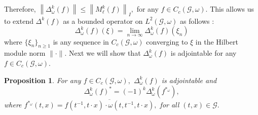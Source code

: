 \documentclass[a4paper,11pt,reqno]{amsart}
\theoremstyle{plain}
\newtheorem{prop}[thm]{Proposition}
\theoremstyle{mainthmstyle}
\theoremstyle{named}
\numberwithin{equation}{section}
\begin{document}
Therefore, $\left \|\Delta_{\omega}^k (f) \right \| \leq \left \|M_{\ell}^k (f) \right \|_{I},$ for any $f \in C_c (\mathcal G, \omega).$ This allows us to extend $\Delta^k (f)$ as a bounded operator on $L^2 (\mathcal G, \omega)$ as follows $:$ 
$$\Delta_{\omega}^k (f) (\xi) = \lim\limits_{n \to \infty} \Delta_{\omega}^k (f) (\xi_n)$$
where $\{\xi_n \}_{n \geq 1}$ is any sequence in $C_c (\mathcal G, \omega)$ converging to $\xi$ in the Hilbert module norm $\|\cdot\|.$ Next we will show that $\Delta_{\omega}^k (f)$ is adjointable for any $f \in C_c (\mathcal G, \omega).$

\begin{prop}\label{prop1}
 For any $f \in C_c (\mathcal G, \omega),$ $\Delta_{\omega}^k (f)$ is adjointable and 
 $$\Delta_{\omega}^k (f)^{\ast} = (-1)^k \Delta_{\omega}^k (f^{\ast_{\omega}}),$$ 
 where $f^{\ast_{\omega}} (t, x) = \overline {f \left (t^{-1}, t \cdot x \right ) \cdot \omega (t, t^{-1}, t \cdot x)},$ for all $(t, x) \in \mathcal G.$
\end{prop}
\end{document}
